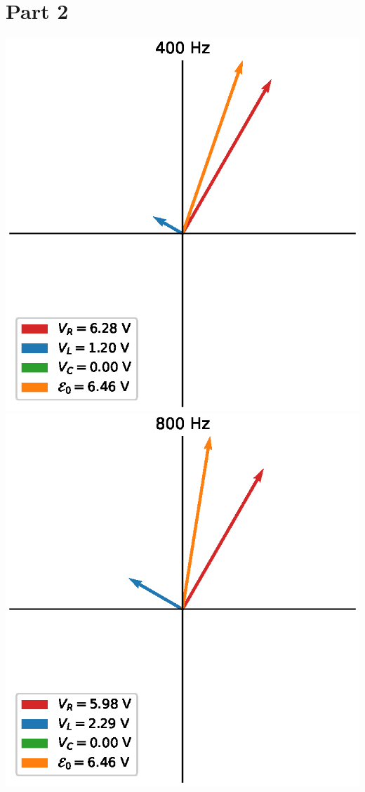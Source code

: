 \documentclass[12pt]{iopart} %
\begin{document}
\section*{Part 2}

\includegraphics{media/part_2_400_hz.eps}
\includegraphics{media/part_2_800_hz.eps}
\end{document}
